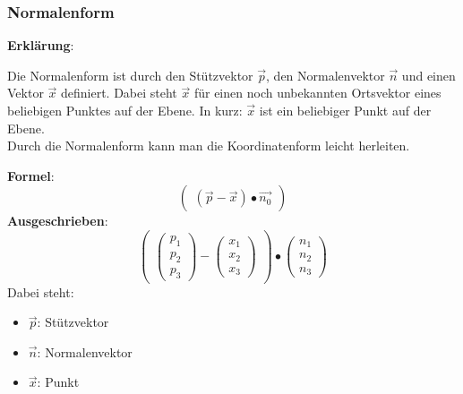 
\subsubsection{Normalenform}
\textbf{Erklärung}: 

Die Normalenform ist durch den Stützvektor $\vec{p}$, 
den Normalenvektor $\vec{n}$ und einen Vektor $\vec{x}$ definiert.
Dabei steht $\vec{x}$ für einen noch unbekannten Ortsvektor eines beliebigen Punktes auf der Ebene. 
In kurz: $\vec{x}$ ist ein beliebiger Punkt auf der Ebene. \\
Durch die Normalenform kann man die Koordinatenform leicht herleiten.

\textbf{Formel}: 
\[
\begin{pmatrix}
    (\vec{p} - \vec{x}) \bullet \vec{n_0}
\end{pmatrix}
\]
\textbf{Ausgeschrieben}:
\[
\begin{pmatrix}
    \begin{pmatrix}
        p_1 \\ p_2 \\ p_3
    \end{pmatrix} 
    - 
    \begin{pmatrix}
        x_1 \\ x_2 \\ x_3
    \end{pmatrix}
\end{pmatrix}
\bullet 
\begin{pmatrix}
    n_1 \\ n_2 \\ n_3
\end{pmatrix}
\]
Dabei steht: 
\begin{itemize}
    \item $\vec{p}$: Stützvektor
    \item $\vec{n}$: Normalenvektor
    \item $\vec{x}$: Punkt
\end{itemize}


